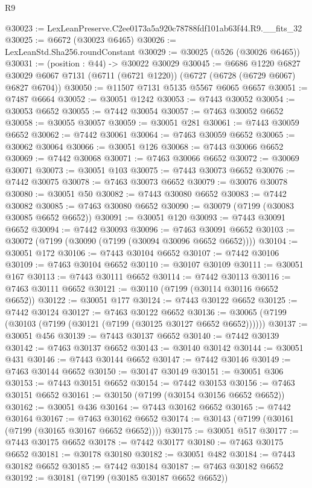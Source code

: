 \begin{lexlean}{R9}
\begin{coremodule}
@30023 := LexLeanPreserve.C2ee0173a5a920c78788fdf101ab63f44.R9.__fits_32
@30025 := @6672 (@30023 @6465)
@30026 := LexLeanStd.Sha256.roundConstant
@30029 := @30025 (@526 (@30026 @6465))
@30031 := (position : @44) -> @30022 @30029
@30045 := @6686
    @1220
    @6827
    @30029
    @6067
    @7131
    (@6711 (@6721 @1220))
    (@6727 (@6728 (@6729 @6067) @6827 @6704))
@30050 := @11507 @7131 @5135 @5567 @6065 @6657
@30051 := @7487 @6664
@30052 := @30051 @1242
@30053 := @7443 @30052
@30054 := @30053 @6652
@30055 := @7442 @30054
@30057 := @7463 @30052 @6652
@30058 := @30055 @30057
@30059 := @30051 @281
@30061 := @7443 @30059 @6652
@30062 := @7442 @30061
@30064 := @7463 @30059 @6652
@30065 := @30062 @30064
@30066 := @30051 @126
@30068 := @7443 @30066 @6652
@30069 := @7442 @30068
@30071 := @7463 @30066 @6652
@30072 := @30069 @30071
@30073 := @30051 @103
@30075 := @7443 @30073 @6652
@30076 := @7442 @30075
@30078 := @7463 @30073 @6652
@30079 := @30076 @30078
@30080 := @30051 @50
@30082 := @7443 @30080 @6652
@30083 := @7442 @30082
@30085 := @7463 @30080 @6652
@30090 := @30079 (@7199 (@30083 @30085 @6652 @6652))
@30091 := @30051 @120
@30093 := @7443 @30091 @6652
@30094 := @7442 @30093
@30096 := @7463 @30091 @6652
@30103 := @30072 (@7199 (@30090 (@7199 (@30094 @30096 @6652 @6652))))
@30104 := @30051 @172
@30106 := @7443 @30104 @6652
@30107 := @7442 @30106
@30109 := @7463 @30104 @6652
@30110 := @30107 @30109
@30111 := @30051 @167
@30113 := @7443 @30111 @6652
@30114 := @7442 @30113
@30116 := @7463 @30111 @6652
@30121 := @30110 (@7199 (@30114 @30116 @6652 @6652))
@30122 := @30051 @177
@30124 := @7443 @30122 @6652
@30125 := @7442 @30124
@30127 := @7463 @30122 @6652
@30136 := @30065 (@7199 (@30103 (@7199 (@30121 (@7199 (@30125 @30127 @6652 @6652))))))
@30137 := @30051 @456
@30139 := @7443 @30137 @6652
@30140 := @7442 @30139
@30142 := @7463 @30137 @6652
@30143 := @30140 @30142
@30144 := @30051 @431
@30146 := @7443 @30144 @6652
@30147 := @7442 @30146
@30149 := @7463 @30144 @6652
@30150 := @30147 @30149
@30151 := @30051 @306
@30153 := @7443 @30151 @6652
@30154 := @7442 @30153
@30156 := @7463 @30151 @6652
@30161 := @30150 (@7199 (@30154 @30156 @6652 @6652))
@30162 := @30051 @436
@30164 := @7443 @30162 @6652
@30165 := @7442 @30164
@30167 := @7463 @30162 @6652
@30174 := @30143 (@7199 (@30161 (@7199 (@30165 @30167 @6652 @6652))))
@30175 := @30051 @517
@30177 := @7443 @30175 @6652
@30178 := @7442 @30177
@30180 := @7463 @30175 @6652
@30181 := @30178 @30180
@30182 := @30051 @482
@30184 := @7443 @30182 @6652
@30185 := @7442 @30184
@30187 := @7463 @30182 @6652
@30192 := @30181 (@7199 (@30185 @30187 @6652 @6652))

\end{coremodule}
\end{lexlean}
